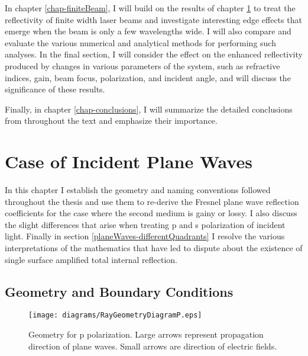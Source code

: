 \documentclass[12pt]{uthesis-v12}
\begin{document}
In chapter \ref{chap-finiteBeam}, I will build on the results of chapter \ref{chap-planeWaves} to treat the reflectivity of finite width laser beams and investigate interesting edge effects that emerge when the beam  is only a few wavelengths wide.  I will also compare and evaluate the various numerical and analytical methods for performing such analyses. In the final section, I will consider the effect on the enhanced reflectivity produced by changes in various parameters of the system, such as refractive indices, gain, beam focus, polarization, and incident angle, and will discuss the significance of these results.

Finally, in chapter \ref{chap-conclusions}, I will summarize the detailed conclusions from throughout the text and emphasize their importance.


\chapter{Case of Incident Plane Waves}\label{chap-planeWaves}
In this chapter I establish the geometry and naming conventions followed throughout the thesis and use them to re-derive the Fresnel plane wave reflection coefficients for the case where the second medium is gainy or lossy.  I also discuss the slight differences that arise when treating p and s polarization of incident light.  Finally in section \ref{planeWaves-differentQuadrants} I resolve the various interpretations of the mathematics that have led to dispute about the existence of single surface amplified total internal reflection.

\section{Geometry and Boundary Conditions}
\begin{figure}[ht]\label{fig-rayGeometryDiagramP}
\centering
\texttt{[image: diagrams/RayGeometryDiagramP.eps]}
\caption[Geometry for p polarization.]{Geometry for p polarization. Large arrows represent propagation direction of plane waves. Small arrows are direction of electric fields.
 \label{planeWaves-definitions}}
\end{figure}
\end{document}
